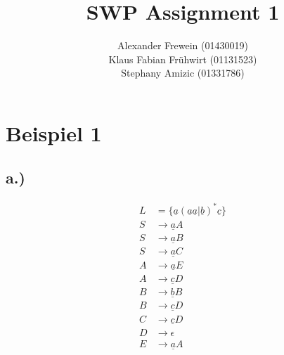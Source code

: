 \documentclass[12pt,runningheads,a4paper]{llncs}
\begin{document}
\title{SWP Assignment 1}


%
%
\author{Alexander Frewein (01430019)\\
		Klaus Fabian Frühwirt (01131523)\\
		Stephany Amizic (01331786)}

%




\maketitle


\section*{Beispiel 1}
\subsection*{a.)}

\begin{align*}
L &= \{\underline{a}(\underline{a}\underline{a}|\underline{b})^* \underline{c}\}\\
S &\rightarrow \underline{a}A  \\
S &\rightarrow \underline{a}B  \\
S &\rightarrow \underline{a}C  \\
A &\rightarrow \underline{a}E  \\
A &\rightarrow \underline{c}D  \\
B &\rightarrow \underline{b}B  \\
B &\rightarrow \underline{c}D  \\
C &\rightarrow \underline{c}D  \\
D &\rightarrow \epsilon  \\
E &\rightarrow \underline{a}A
\end{align*}
\end{document}
